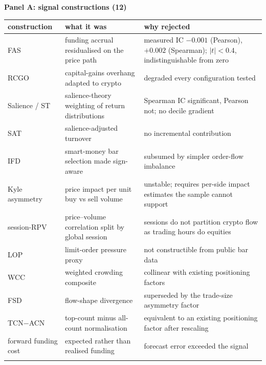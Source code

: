\documentclass[11pt,letterpaper]{article}
\begin{document}
\small
\noindent\textbf{Panel A: signal constructions (12)}
\vspace{3pt}
\begin{longtable}{p{}p{}p{}}
\toprule
construction & what it was & why rejected \\
\midrule\addlinespace[2pt]
\endhead
FAS & funding accrual residualised on the price path & measured IC $-0.001$ (Pearson), $+0.002$ (Spearman); $|t|<0.4$, indistinguishable from zero \\
RCGO & capital-gains overhang adapted to crypto & degraded every configuration tested \\
Salience / ST & salience-theory weighting of return distributions & Spearman IC significant, Pearson not; no decile gradient \\
SAT & salience-adjusted turnover & no incremental contribution \\
IFD & smart-money bar selection made sign-aware & subsumed by simpler order-flow imbalance \\
Kyle asymmetry & price impact per unit buy vs sell volume & unstable; requires per-side impact estimates the sample cannot support \\
session-RPV & price--volume correlation split by global session & sessions do not partition crypto flow as trading hours do equities \\
LOP & limit-order pressure proxy & not constructible from public bar data \\
WCC & weighted crowding composite & collinear with existing positioning factors \\
FSD & flow-shape divergence & superseded by the trade-size asymmetry factor \\
TCN$-$ACN & top-count minus all-count normalisation & equivalent to an existing positioning factor after rescaling \\
forward funding cost & expected rather than realised funding & forecast error exceeded the signal \\
\addlinespace[2pt]
\bottomrule
\end{longtable}
\normalsize
\end{document}
